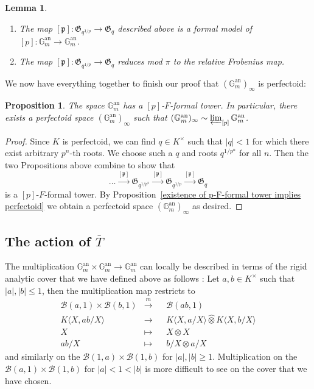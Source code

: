 \documentclass[10pt,oneside]{amsart}
\newtheorem{lemma}[theorem]{Lemma}
\newtheorem{proposition}[theorem]{Proposition}
\theoremstyle{definition}
\begin{document}
	\begin{lemma}\indent 
	
		\begin{enumerate} 
		\item The map $[\mathfrak p]: \mathfrak G_{q^{1/p}}\rightarrow  \mathfrak G_q$ described above is a formal model of $[p]:\mathbb G_m^{\operatorname{an}}\rightarrow \mathbb G_m^{\operatorname{an}}$.
                 \item The map $[\mathfrak p]: \mathfrak G_{q^{1/p}}\rightarrow  \mathfrak G_q$ reduces mod $\pi$ to the relative Frobenius map.
                 \end{enumerate}
	\end{lemma}
	We now have everything together to finish our proof that $(\mathbb G_m^{\operatorname{an}})_\infty$ is perfectoid:
	\begin{proposition}
		The space $\mathbb G_m^{\operatorname{an}}$ has a $[p]$-$F$-formal tower. In particular, there exists a perfectoid space $(\mathbb G_m^{\operatorname{an}})_\infty$ such that $(\mathbb G_m^{\operatorname{an}})_\infty \sim \varprojlim_{[p]} \mathbb G_m^{\operatorname{an}}$.
	\end{proposition}
	\begin{proof}
		Since $K$ is perfectoid, we can find $q\in K^\times$ such that $|q|<1$ for which there exist arbitrary $p^n$-th roots. We choose such a $q$ and roots $q^{1/p^n}$ for all $n$. Then the two Propositions above combine to show that 
		\[\dots \xrightarrow{[\mathfrak p]} \mathfrak G_{q^{1/p^2}}\xrightarrow{[\mathfrak p]} \mathfrak G_{q^{1/p}}\xrightarrow{[\mathfrak p]} \mathfrak G_q\]
		is a $[p]$-$F$-formal tower.
		By Proposition~\ref{existence of p-F-formal tower implies perfectoid} we obtain a perfectoid space $(\mathbb G_m^{\operatorname{an}})_\infty$ as desired.
	\end{proof}
	
	\subsection{The action of $\overline{T}$}
	The multiplication $\mathbb G_m^{\operatorname{an}}\times \mathbb G_m^{\operatorname{an}}\rightarrow \mathbb G_m^{\operatorname{an}}$ can locally be described in terms of the rigid analytic cover that we have defined above as follows  : Let $a,b \in K^\times$ such that $|a|,|b|\leq 1$, then the multiplication map restricts to
	\begin{equation}
	\begin{alignedat}{2} \label{torus multiplication map}
	\mathcal B(a,1)\times \mathcal B(b,1)&\xrightarrow{m}&& \mathcal B(ab,1)\\
	K\langle X,ab/X\rangle&\rightarrow &&K\langle X,a/X\rangle\widehat{\otimes} K\langle X,b/X\rangle\\
	X&\mapsto&& X\otimes X\\
	ab/X&\mapsto&& b/X\otimes a/X
	\end{alignedat}
	\end{equation}
	and similarly on the $\mathcal B(1,a)\times \mathcal B(1,b)$ for $|a|,|b|\geq 1$. Multiplication on the $\mathcal B(a,1)\times \mathcal B(1,b)$ for $|a|< 1 < |b|$ is more difficult to see on the cover that we have chosen.
	
\end{document}
